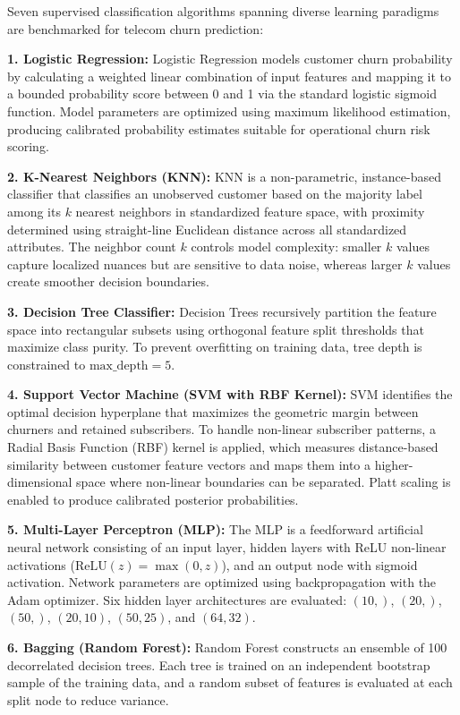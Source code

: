 \documentclass[12pt,oneside]{report}
\begin{document}
Seven supervised classification algorithms spanning diverse learning paradigms are benchmarked for telecom churn prediction:

\textbf{1. Logistic Regression:}
Logistic Regression models customer churn probability by calculating a weighted linear combination of input features and mapping it to a bounded probability score between 0 and 1 via the standard logistic sigmoid function. Model parameters are optimized using maximum likelihood estimation, producing calibrated probability estimates suitable for operational churn risk scoring.

\textbf{2. K-Nearest Neighbors (KNN):}
KNN is a non-parametric, instance-based classifier that classifies an unobserved customer based on the majority label among its $k$ nearest neighbors in standardized feature space, with proximity determined using straight-line Euclidean distance across all standardized attributes. The neighbor count $k$ controls model complexity: smaller $k$ values capture localized nuances but are sensitive to data noise, whereas larger $k$ values create smoother decision boundaries.

\textbf{3. Decision Tree Classifier:}
Decision Trees recursively partition the feature space into rectangular subsets using orthogonal feature split thresholds that maximize class purity. To prevent overfitting on training data, tree depth is constrained to $\text{max\_depth} = 5$.

\textbf{4. Support Vector Machine (SVM with RBF Kernel):}
SVM identifies the optimal decision hyperplane that maximizes the geometric margin between churners and retained subscribers. To handle non-linear subscriber patterns, a Radial Basis Function (RBF) kernel is applied, which measures distance-based similarity between customer feature vectors and maps them into a higher-dimensional space where non-linear boundaries can be separated. Platt scaling is enabled to produce calibrated posterior probabilities.

\textbf{5. Multi-Layer Perceptron (MLP):}
The MLP is a feedforward artificial neural network consisting of an input layer, hidden layers with ReLU non-linear activations ($\text{ReLU}(z) = \max(0, z)$), and an output node with sigmoid activation. Network parameters are optimized using backpropagation with the Adam optimizer. Six hidden layer architectures are evaluated: $(10,)$, $(20,)$, $(50,)$, $(20, 10)$, $(50, 25)$, and $(64, 32)$.

\textbf{6. Bagging (Random Forest):}
Random Forest constructs an ensemble of 100 decorrelated decision trees. Each tree is trained on an independent bootstrap sample of the training data, and a random subset of features is evaluated at each split node to reduce variance.
\end{document}
